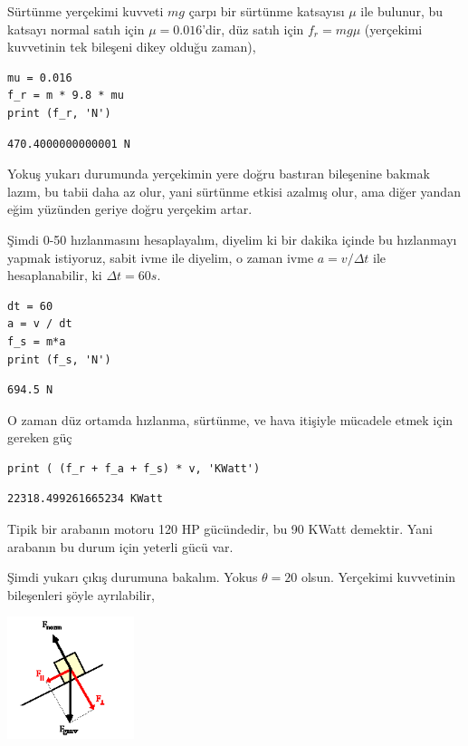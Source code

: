 \documentclass[12pt,fleqn]{article}\usepackage{../../common}
\begin{document}
Sürtünme yerçekimi kuvveti $mg$ çarpı bir sürtünme katsayısı $\mu$ ile bulunur,
bu katsayı normal satıh için $\mu = 0.016$'dir, düz satıh için $f_r = m g \mu$
(yerçekimi kuvvetinin tek bileşeni dikey olduğu zaman),

\begin{verbatim}
mu = 0.016
f_r = m * 9.8 * mu
print (f_r, 'N')
\end{verbatim}

\begin{verbatim}
470.4000000000001 N
\end{verbatim}

Yokuş yukarı durumunda yerçekimin yere doğru bastıran bileşenine bakmak lazım,
bu tabii daha az olur, yani sürtünme etkisi azalmış olur, ama diğer yandan eğim
yüzünden geriye doğru yerçekim artar.

Şimdi 0-50 hızlanmasını hesaplayalım, diyelim ki bir dakika içinde bu hızlanmayı
yapmak istiyoruz, sabit ivme ile diyelim, o zaman ivme $a = v / \Delta t$ ile
hesaplanabilir, ki $\Delta t = 60 s$.

\begin{verbatim}
dt = 60
a = v / dt
f_s = m*a
print (f_s, 'N')
\end{verbatim}

\begin{verbatim}
694.5 N
\end{verbatim}

O zaman düz ortamda hızlanma, sürtünme, ve hava itişiyle mücadele etmek için
gereken güç

\begin{verbatim}
print ( (f_r + f_a + f_s) * v, 'KWatt')
\end{verbatim}

\begin{verbatim}
22318.499261665234 KWatt
\end{verbatim}

Tipik bir arabanın motoru 120 HP gücündedir, bu 90 KWatt demektir. Yani arabanın
bu durum için yeterli gücü var.

Şimdi yukarı çıkış durumuna bakalım. Yokus $\theta = 20$ olsun. Yerçekimi
kuvvetinin bileşenleri şöyle ayrılabilir,

\includegraphics[width=10em]{phy_005_basics_08.png}
\end{document}
